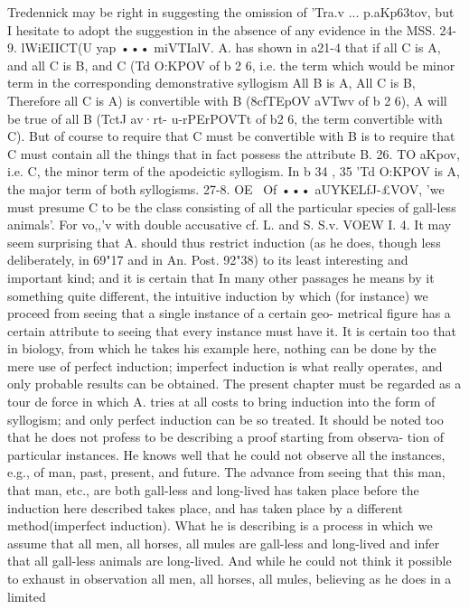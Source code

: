 {{{{{{{{{{{{{{{{{{{{{{{{Tredennick may be right in suggesting the omission of 'Tra.v ...
p.aKp6{3tov, but I hesitate to adopt the suggestion in the absence
of any evidence in the MSS.
24-9. lWiEIICT(U yap ••• miVTIalV. A. has shown in a21-4 that
if all C is A, and all C is B, and C (Td O:KPOV of b 2 6, i.e. the term
which would be minor term in the corresponding demonstrative
syllogism All B is A, All C is B, Therefore all C is A) is convertible
with B (8cfTEpOV aVTwv of b 2 6), A will be true of all B (TctJ av·rt-
u-rPErPOVTt of b2 6, the term convertible with C). But of course to
require that C must be convertible with B is to require that C
must contain all the things that in fact possess the attribute B.
26. TO aKpov, i.e. C, the minor term of the apodeictic syllogism.
In b 34 , 35 'Td O:KPOV is A, the major term of both syllogisms.
27-8. OE~ Of ••• aUYKELfJ-£VOV, 'we must presume C to be the
class consisting of all the particular species of gall-less animals'.
For vo,,'v with double accusative cf. L. and S. S.v. VOEW I. 4.
It may seem surprising that A. should thus restrict induction
(as he does, though less deliberately, in 69"17 and in An. Post.
92"38) to its least interesting and important kind; and it is
certain that In many other passages he means by it something
quite different, the intuitive induction by which (for instance)
we proceed from seeing that a single instance of a certain geo-
metrical figure has a certain attribute to seeing that every
instance must have it. It is certain too that in biology, from
which he takes his example here, nothing can be done by the
mere use of perfect induction; imperfect induction is what really
operates, and only probable results can be obtained. The present
chapter must be regarded as a tour de force in which A. tries at
all costs to bring induction into the form of syllogism; and only
perfect induction can be so treated. It should be noted too that
he does not profess to be describing a proof starting from observa-
tion of particular instances. He knows well that he could not
observe all the instances, e.g., of man, past, present, and future.
The advance from seeing that this man, that man, etc., are both
gall-less and long-lived has taken place before the induction here
described takes place, and has taken place by a different method(imperfect induction). What he is describing is a process in
which we assume that all men, all horses, all mules are gall-less
and long-lived and infer that all gall-less animals are long-lived.
And while he could not think it possible to exhaust in observation
all men, all horses, all mules, believing as he does in a limited
}}}}}}}}}}}}}}}}}}}}}}}}}
